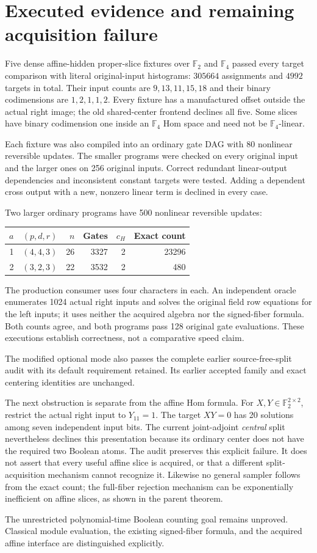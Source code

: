 \documentclass[11pt]{article}
\newcommand{\F}{\mathbb F}\newcommand{\Hom}{\operatorname{Hom}}
\begin{document}
\section{Executed evidence and remaining acquisition failure}

Five dense affine-hidden proper-slice fixtures over $\F_2$ and $\F_4$
passed every target comparison with literal original-input histograms:
$305664$ assignments and $4992$ targets in total. Their input counts
are $9,13,11,15,18$ and their binary codimensions are $1,2,1,1,2$.
Every fixture has a manufactured offset outside the actual right image;
the old shared-center frontend declines all five. Some slices have
binary codimension one inside an $\F_4$ Hom space and need not be
$\F_4$-linear.

Each fixture was also compiled into an ordinary gate DAG with 80
nonlinear reversible updates. The smaller programs were checked on
every original input and the larger ones on 256 original inputs.
Correct redundant linear-output dependencies and inconsistent
constant targets were tested. Adding a dependent cross output with a
new, nonzero linear term is declined in every case.

Two larger ordinary programs have 500 nonlinear reversible updates:
\begin{center}
\begin{tabular}{rrrrrr}
\toprule
$a$ & $(p,d,r)$ & $n$ & Gates & $c_H$ & Exact count\\
\midrule
1 & $(4,4,3)$ & 26 & 3327 & 2 & 23296\\
2 & $(3,2,3)$ & 22 & 3532 & 2 & 480\\
\bottomrule
\end{tabular}
\end{center}
The production consumer uses four characters in each. An independent
oracle enumerates 1024 actual right inputs and solves the original
field row equations for the left inputs; it uses neither the acquired
algebra nor the signed-fiber formula. Both counts agree, and both
programs pass 128 original gate evaluations. These executions establish
correctness, not a comparative speed claim.

The modified optional mode also passes the complete earlier
source-free-split audit with its default requirement retained.
Its earlier accepted family and exact centering identities are
unchanged.

The next obstruction is separate from the affine Hom formula. For
$X,Y\in\F_2^{2\times2}$, restrict the actual right input to
$Y_{11}=1$. The target $XY=0$ has 20 solutions among seven independent
input bits. The current joint-adjoint \emph{central} split nevertheless
declines this presentation because its ordinary center does not have
the required two Boolean atoms. The audit preserves this explicit
failure. It does not assert that every useful affine slice is acquired,
or that a different split-acquisition mechanism cannot recognize it.
Likewise no general sampler follows from the exact count; the
full-fiber rejection mechanism can be exponentially inefficient on
affine slices, as shown in the parent theorem.

The unrestricted polynomial-time Boolean counting goal remains
unproved. Classical module evaluation, the existing signed-fiber
formula, and the acquired affine interface are distinguished explicitly.
\end{document}

